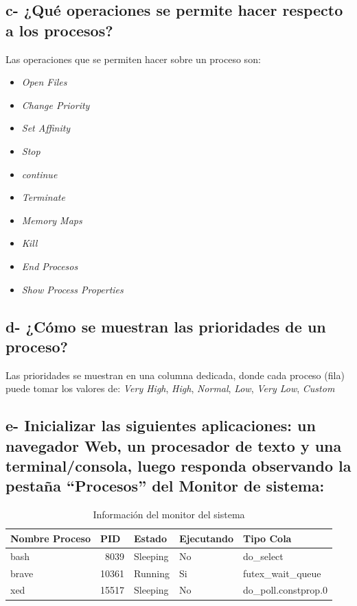 \documentclass{article}
\begin{document}
\subsection*{c- ¿Qué operaciones se permite hacer respecto a los procesos?}

\noindent
Las operaciones que se permiten hacer sobre un proceso son:
\begin{itemize}
  \item \textit{Open Files}
  \item \textit{Change Priority}
  \item \textit{Set Affinity}
  \item \textit{Stop}
  \item \textit{continue}
  \item \textit{Terminate}
  \item \textit{Memory Maps}
  \item \textit{Kill}
  \item \textit{End Procesos}
  \item \textit{Show Process Properties}
\end{itemize}

\subsection*{d- ¿Cómo se muestran las prioridades de un proceso?}

\noindent
Las prioridades se muestran en una columna dedicada, donde cada proceso (fila) puede tomar los valores de: \textit{Very High}, \textit{High}, \textit{Normal}, 
\textit{Low}, \textit{Very Low}, \textit{Custom}

\subsection*{e- Inicializar las siguientes aplicaciones: un navegador Web, un procesador de texto y una
terminal/consola, luego responda observando la pestaña “Procesos” del Monitor de sistema:}


\begin{table}[htbp]
  \centering
  \caption{Información del monitor del sistema}
    \begin{tabular}{|lrlll|}
    \toprule
    \rowcolor[rgb]{ .357,  .608,  .835} \textcolor[rgb]{ 1,  1,  1}{\textbf{Nombre Proceso}} & \multicolumn{1}{l}{\textcolor[rgb]{ 1,  1,  1}{\textbf{PID}}} & \textcolor[rgb]{ 1,  1,  1}{\textbf{Estado}} & \textcolor[rgb]{ 1,  1,  1}{\textbf{Ejecutando}} & \textcolor[rgb]{ 1,  1,  1}{\textbf{Tipo Cola}} \\
    \midrule
    \rowcolor[rgb]{ .867,  .922,  .969} bash  & 8039  & Sleeping & No    & do\_select \\
    \midrule
    brave & 10361 & Running & Si    & futex\_wait\_queue \\
    \midrule
    \rowcolor[rgb]{ .867,  .922,  .969} xed   & 15517 & Sleeping & No    & do\_poll.constprop.0 \\
    \bottomrule
    \end{tabular}%
  \label{tab:monitor_sistema}%
\end{table}%
 
\end{document}
